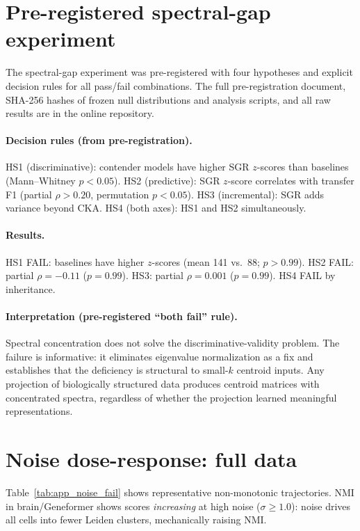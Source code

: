 \documentclass[11pt]{article}
\begin{document}
\section{Pre-registered spectral-gap experiment}
\label{app:spectral}

The spectral-gap experiment was pre-registered with four hypotheses and
explicit decision rules for all pass/fail combinations. The full
pre-registration document, SHA-256 hashes of frozen null distributions
and analysis scripts, and all raw results are in the online repository.

\paragraph{Decision rules (from pre-registration).} HS1 (discriminative):
contender models have higher SGR $z$-scores than baselines (Mann--Whitney
$p < 0.05$). HS2 (predictive): SGR $z$-score correlates with transfer
F1 (partial $\rho > 0.20$, permutation $p < 0.05$). HS3 (incremental):
SGR adds variance beyond CKA. HS4 (both axes): HS1 and HS2
simultaneously.

\paragraph{Results.} HS1 FAIL: baselines have higher $z$-scores
(mean 141 vs.\ 88; $p > 0.99$). HS2 FAIL: partial $\rho = -0.11$
($p = 0.99$). HS3: partial $\rho = 0.001$ ($p = 0.99$). HS4 FAIL by
inheritance.

\paragraph{Interpretation (pre-registered ``both fail'' rule).} Spectral
concentration does not solve the discriminative-validity problem. The
failure is informative: it eliminates eigenvalue normalization as a fix
and establishes that the deficiency is structural to small-$k$ centroid
inputs. Any projection of biologically structured data produces
centroid matrices with concentrated spectra, regardless of whether the
projection learned meaningful representations.


\section{Noise dose-response: full data}
\label{app:noise}

Table~\ref{tab:app_noise_fail} shows representative non-monotonic
trajectories. NMI in brain/Geneformer shows scores \emph{increasing} at
high noise ($\sigma \geq 1.0$): noise drives all cells into fewer
Leiden clusters, mechanically raising NMI.
\end{document}

